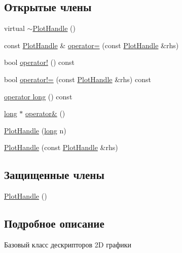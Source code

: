 \subsection*{Открытые члены}
\begin{DoxyCompactItemize}
\item 
virtual \hyperlink{classxyplot_1_1_plot_handle_a1aa470b07c0cf1712f15bafdb5fb8a48}{$\sim$\-Plot\-Handle} ()
\item 
const \hyperlink{classxyplot_1_1_plot_handle}{Plot\-Handle} \& \hyperlink{classxyplot_1_1_plot_handle_ab1fd6b3147239c1485a345dc2baadc05}{operator=} (const \hyperlink{classxyplot_1_1_plot_handle}{Plot\-Handle} \&rhs)
\item 
bool \hyperlink{classxyplot_1_1_plot_handle_afd66331f425ea57e0562dfb74a81177b}{operator!} () const 
\item 
bool \hyperlink{classxyplot_1_1_plot_handle_afa7e238ea63f7ab13f24a377aab21282}{operator!=} (const \hyperlink{classxyplot_1_1_plot_handle}{Plot\-Handle} \&rhs) const 
\item 
\hyperlink{classxyplot_1_1_plot_handle_a1fa0bcf721b1b346f7d96230098da3fe}{operator long} () const 
\item 
\hyperlink{namespacexyplot_a27bc71b0bdfac09495e7e531d8a918c5}{long} $\ast$ \hyperlink{classxyplot_1_1_plot_handle_a5372007842b00fea6760f0324ed3220e}{operator\&} ()
\item 
\hyperlink{classxyplot_1_1_plot_handle_ab2004cbf4e4400de4e4413b9b75c281c}{Plot\-Handle} (\hyperlink{namespacexyplot_a27bc71b0bdfac09495e7e531d8a918c5}{long} n)
\item 
\hyperlink{classxyplot_1_1_plot_handle_a5226ba05ba9568584b2ef81fbf76e152}{Plot\-Handle} (const \hyperlink{classxyplot_1_1_plot_handle}{Plot\-Handle} \&rhs)
\end{DoxyCompactItemize}
\subsection*{Защищенные члены}
\begin{DoxyCompactItemize}
\item 
\hyperlink{classxyplot_1_1_plot_handle_afddd74546013d446df5478d72c87eef4}{Plot\-Handle} ()
\end{DoxyCompactItemize}


\subsection{Подробное описание}
Базовый класс дескрипторов 2\-D графики 

